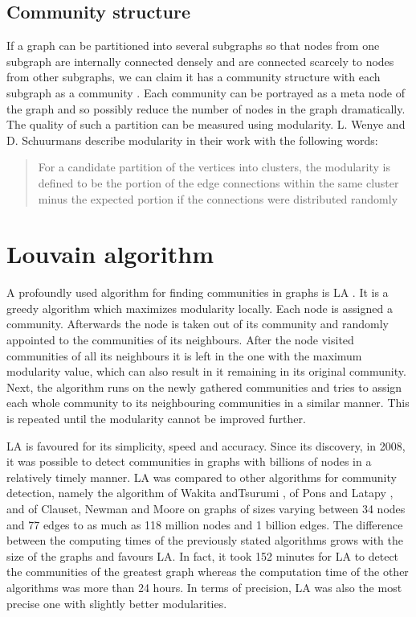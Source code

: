 \subsection{Community structure}
If a graph can be partitioned into several subgraphs so that nodes from one subgraph are internally connected densely and are connected scarcely to nodes from other subgraphs, we can claim it has a  community structure with each subgraph as a community \cite{communitiesOverview}. Each community can be portrayed as a meta node of the graph and so possibly reduce the number of nodes in the graph dramatically. The quality of such a partition can be measured using modularity. \cite{modularityOverview} L. Wenye and D. Schuurmans describe modularity in their work with the following words: \begin{quotation}  For a candidate partition of the vertices into clusters, the modularity is defined to be the portion of the edge connections within the same cluster minus the expected portion if the connections were distributed randomly \cite{modularityDefinition} \end{quotation} 

\section{Louvain algorithm} \label{louvainAlgorithm}
A profoundly used algorithm for finding communities in graphs is LA \cite{louvainAlgorithm}. It is a greedy algorithm which maximizes modularity locally. Each node is assigned a community. Afterwards the node is taken out of its community and randomly appointed to the communities of its neighbours. After the node visited communities of all its neighbours it is left in the one with the maximum modularity value, which can also result in it remaining in its original community. Next, the algorithm runs on the newly gathered communities and tries to assign each whole community to its neighbouring communities in a similar manner. This is repeated until the modularity cannot be improved further.

LA is favoured for its simplicity, speed and accuracy. Since its discovery, in 2008, it was possible to detect communities in graphs with billions of nodes in a relatively timely manner. LA was compared to other algorithms for community detection, namely the algorithm of Wakita andTsurumi \cite{wakitaAndToshiyuki}, of Pons and Latapy \cite{ponsAndLatapy}, and of Clauset, Newman and Moore \cite{CNM} on graphs of sizes varying between 34 nodes and 77 edges to as much as 118 million nodes and 1 billion edges. The difference between the computing times of the previously stated algorithms grows with the size of the graphs and favours LA. In fact, it took 152 minutes for LA to detect the communities of the greatest graph whereas the computation time of the other algorithms was more than 24 hours. In terms of precision, LA was also the most precise one with slightly better modularities.


